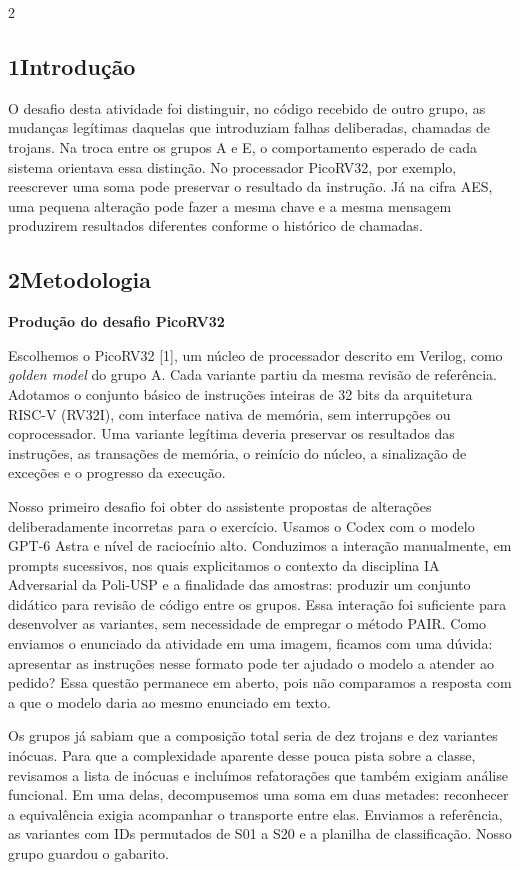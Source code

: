 \documentclass[10pt,a4paper]{article}
\newcommand{\secao}[1]{\subsection*{#1}}
\newcommand{\tema}[1]{\par\medskip\noindent\textbf{#1}\par}
\begin{document}
\begin{multicols}{2}
\raggedcolumns
\fontsize{9.6}{11.2}\selectfont
\secao{1\quad Introdução}
O desafio desta atividade foi distinguir, no código recebido de outro grupo, as mudanças legítimas daquelas que introduziam falhas deliberadas, chamadas de trojans. Na troca entre os grupos A e E, o comportamento esperado de cada sistema orientava essa distinção. No processador PicoRV32, por exemplo, reescrever uma soma pode preservar o resultado da instrução. Já na cifra AES, uma pequena alteração pode fazer a mesma chave e a mesma mensagem produzirem resultados diferentes conforme o histórico de chamadas.

\secao{2\quad Metodologia}
\tema{Produção do desafio PicoRV32}
Escolhemos o PicoRV32 [1], um núcleo de processador descrito em Verilog, como \textit{golden model} do grupo A. Cada variante partiu da mesma revisão de referência. Adotamos o conjunto básico de instruções inteiras de 32 bits da arquitetura RISC-V (RV32I), com interface nativa de memória, sem interrupções ou coprocessador. Uma variante legítima deveria preservar os resultados das instruções, as transações de memória, o reinício do núcleo, a sinalização de exceções e o progresso da execução.

Nosso primeiro desafio foi obter do assistente propostas de alterações deliberadamente incorretas para o exercício. Usamos o Codex com o modelo GPT-6 Astra e nível de raciocínio alto. Conduzimos a interação manualmente, em prompts sucessivos, nos quais explicitamos o contexto da disciplina IA Adversarial da Poli-USP e a finalidade das amostras: produzir um conjunto didático para revisão de código entre os grupos. Essa interação foi suficiente para desenvolver as variantes, sem necessidade de empregar o método PAIR. Como enviamos o enunciado da atividade em uma imagem, ficamos com uma dúvida: apresentar as instruções nesse formato pode ter ajudado o modelo a atender ao pedido? Essa questão permanece em aberto, pois não comparamos a resposta com a que o modelo daria ao mesmo enunciado em texto.

Os grupos já sabiam que a composição total seria de dez trojans e dez variantes inócuas. Para que a complexidade aparente desse pouca pista sobre a classe, revisamos a lista de inócuas e incluímos refatorações que também exigiam análise funcional. Em uma delas, decompusemos uma soma em duas metades: reconhecer a equivalência exigia acompanhar o transporte entre elas. Enviamos a referência, as variantes com IDs permutados de S01 a S20 e a planilha de classificação. Nosso grupo guardou o gabarito.


\end{multicols}
\end{document}
